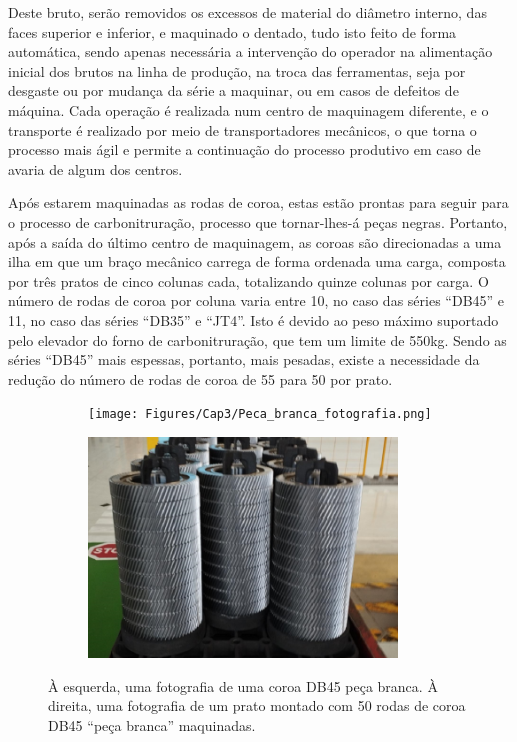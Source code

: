 \par
Deste bruto, serão removidos os excessos de material do diâmetro interno, das faces superior e inferior, e maquinado o dentado, tudo isto feito de forma automática, sendo apenas necessária a intervenção do operador na alimentação inicial dos brutos na linha de produção, na troca das ferramentas, seja por desgaste ou por mudança da série a maquinar, ou em casos de defeitos de máquina. Cada operação é realizada num centro de maquinagem diferente, e o transporte é realizado por meio de transportadores mecânicos, o que torna o processo mais ágil e permite a continuação do processo produtivo em caso de avaria de algum dos centros.

\par
Após estarem maquinadas as rodas de coroa, estas estão prontas para seguir para o processo de carbonitruração, processo que tornar-lhes-á peças negras. Portanto, após a saída do último centro de maquinagem, as coroas são direcionadas a uma ilha em que um braço mecânico carrega de forma ordenada uma carga, composta por três pratos de cinco colunas cada, totalizando quinze colunas por carga. O número de rodas de coroa por coluna varia entre 10, no caso das séries “DB45” e 11, no caso das séries “DB35” e “JT4”. Isto é devido ao peso máximo suportado pelo elevador do forno de carbonitruração, que tem um limite de 550kg. Sendo as séries “DB45” mais espessas, portanto, mais pesadas, existe a necessidade da redução do número de rodas de coroa de 55 para 50 por prato.
\begin{figure}[htb]
    \centering
    \begin{subfigure}{.5\textwidth}
        \centering
        \texttt{[image: Figures/Cap3/Peca\_branca\_fotografia.png]}
        \caption[]%
        {}
        \label{fig:Peca_branca_fotografia}
    \end{subfigure}%
    \begin{subfigure}{.5\textwidth}
        \centering
        \includegraphics[width = 0.9\textwidth]{Figures/Cap3/Carga_fotografia.png}
        \caption{}
        \label{fig:Carga_peca_branca}
    \end{subfigure}
    \caption[Peça branca final e Prato de Rodas de coroa série DB35]%
    {À esquerda, uma fotografia de uma coroa DB45 peça branca. À direita, uma fotografia de um prato montado com 50 rodas de coroa DB45 “peça branca” maquinadas.}
\end{figure}
